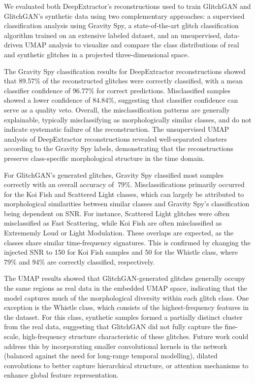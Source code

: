 \documentclass[reprint,nofootinbib,amsmath,amssymb,aps,floatfix]{revtex4-2}
\begin{document}
We evaluated both DeepExtractor's reconstructions used to train GlitchGAN and GlitchGAN's synthetic data using two complementary approaches: a supervised classification analysis using Gravity Spy, a state-of-the-art glitch classification algorithm trained on an extensive labeled dataset, and an unsupervised, data-driven UMAP analysis to visualize and compare the class distributions of real and synthetic glitches in a projected three-dimensional space.

The Gravity Spy classification results for DeepExtractor reconstructions showed that 89.57\% of the reconstructed glitches were correctly classified, with a mean classifier confidence of 96.77\% for correct predictions.
Misclassified samples showed a lower confidence of $84.84\%$, suggesting that classifier confidence can serve as a quality veto.
Overall, the misclassification patterns are generally explainable, typically misclassifying as morphologically similar classes, and do not indicate systematic failure of the reconstruction.
The unsupervised UMAP analysis of DeepExtractor reconstructions revealed well-separated clusters according to the Gravity Spy labels, demonstrating that the reconstructions preserve class-specific morphological structure in the time domain.

For GlitchGAN's generated glitches, Gravity Spy classified most samples correctly with an overall accuracy of $~79\%$.
Misclassifications primarily occurred for the Koi Fish and Scattered Light classes, which can largely be attributed to morphological similarities between similar classes and Gravity Spy's classification being dependent on SNR.
For instance, Scattered Light glitches were often misclassified as Fast Scattering, while Koi Fish are often misclassified as Extrememly Loud or Light Modulation.
These overlaps are expected, as the classes share similar time-frequency signatures.
This is confirmed by changing the injected SNR to 150 for Koi Fish samples and 50 for the Whistle class, where 79\% and 94\% are correctly classified, respectively.

The UMAP results showed that GlitchGAN-generated glitches generally occupy the same regions as real data in the embedded UMAP space, indicating that the model captures much of the morphological diversity within each glitch class.
One exception is the Whistle class, which consists of the highest-frequency features in the dataset.
For this class, synthetic samples formed a partially distinct cluster from the real data, suggesting that GlitchGAN did not fully capture the fine-scale, high-frequency structure characteristic of these glitches.
Future work could address this by incorporating smaller convolutional kernels in the network (balanced against the need for long-range temporal modelling), dilated convolutions to better capture hierarchical structure, or attention mechanisms to enhance global feature representation.
\end{document}

